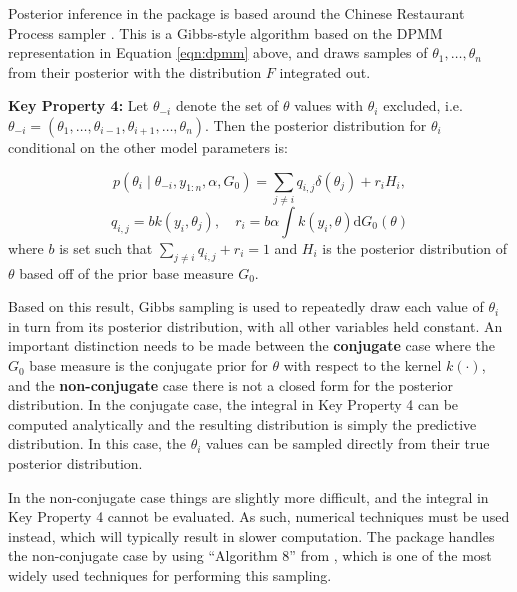 \documentclass[nojss]{jss}
\begin{document}
Posterior inference in the  package is based around the Chinese Restaurant Process sampler \citep{neal_markov_2000}. This is a Gibbs-style algorithm based on the DPMM representation in Equation \ref{eqn:dpmm} above, and draws samples of $\theta_1,\ldots,\theta_n$ from their posterior with the distribution $F$ integrated out.

\begin{tcolorbox}
\textbf{Key Property 4:}  Let $\theta_{-i}$ denote the set of $\theta$ values with $\theta_i$ excluded, i.e. $\theta_{-i} = (\theta_1,\ldots,\theta_{i-1},\theta_{i+1},\ldots,\theta_n)$. Then the posterior distribution for $\theta_i$ conditional on the other model parameters is:

$$p(\theta_i \mid \theta_{-i}, y_{1:n},\alpha,G_0) = \sum _{j \neq i} q_{i,j} \delta (\theta_j ) + r_i H_i,$$
$$q_{i,j} = b k(y_i , \theta _j),  \quad r_i = b \alpha \int k(y_i , \theta) \mathrm{d} G_0 ( \theta )$$
where $b$ is set such that $\sum _{j \neq i } q_{i,j} + r_i = 1$ and $H_i$ is the posterior distribution of $\theta$ based off of the prior base measure $G_0$.
\end{tcolorbox}

Based on this result, Gibbs sampling is used to repeatedly draw each value of $\theta_i$ in turn from its posterior distribution, with all other variables held constant. An important distinction needs to be made between the \textbf{conjugate} case where the $G_0$ base measure is the conjugate prior for $\theta$ with respect to the kernel $k(\cdot)$, and the \textbf{non-conjugate} case there is not a closed form for the posterior distribution. In the conjugate case, the integral in Key Property 4 can be computed analytically and the resulting distribution is simply the predictive distribution. In this case, the $\theta_i$ values can be sampled directly from their true posterior distribution.

In the non-conjugate case things are slightly more difficult, and the integral in Key Property 4 cannot be evaluated. As such, numerical techniques must be used instead, which will typically result in slower computation. The  package handles the non-conjugate case by using ``Algorithm 8'' from \citep{neal_markov_2000}, which is one of the most widely used techniques for performing this sampling.
\end{document}
